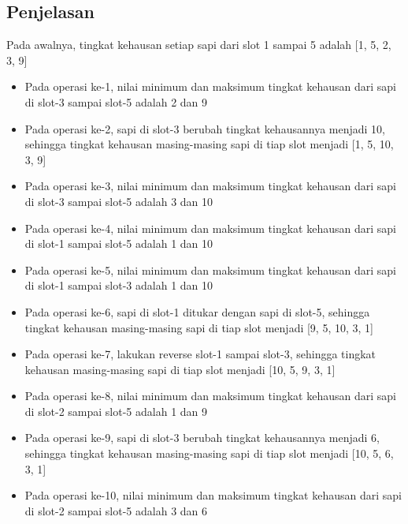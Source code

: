 \documentclass{article}
\begin{document}
\subsection*{Penjelasan}
Pada awalnya, tingkat kehausan setiap sapi dari slot 1 sampai 5 adalah [1, 5, 2, 3, 9]
\begin{itemize}
\item Pada operasi ke-1, nilai minimum dan maksimum tingkat kehausan dari sapi di slot-3 sampai slot-5 adalah 2 dan 9
\item Pada operasi ke-2, sapi di slot-3 berubah tingkat kehausannya menjadi 10, sehingga tingkat kehausan masing-masing sapi di tiap slot menjadi [1, 5, 10, 3, 9]
\item Pada operasi ke-3, nilai minimum dan maksimum tingkat kehausan dari sapi di slot-3 sampai slot-5 adalah 3 dan 10
\item Pada operasi ke-4, nilai minimum dan maksimum tingkat kehausan dari sapi di slot-1 sampai slot-5 adalah 1 dan 10
\item Pada operasi ke-5, nilai minimum dan maksimum tingkat kehausan dari sapi di slot-1 sampai slot-3 adalah 1 dan 10
\item Pada operasi ke-6, sapi di slot-1 ditukar dengan sapi di slot-5, sehingga tingkat kehausan masing-masing sapi di tiap slot menjadi [9, 5, 10, 3, 1]
\item Pada operasi ke-7, lakukan reverse slot-1 sampai slot-3, sehingga tingkat kehausan masing-masing sapi di tiap slot menjadi [10, 5, 9, 3, 1]
\item Pada operasi ke-8, nilai minimum dan maksimum tingkat kehausan dari sapi di slot-2 sampai slot-5 adalah 1 dan 9
\item Pada operasi ke-9, sapi di slot-3 berubah tingkat kehausannya menjadi 6, sehingga tingkat kehausan masing-masing sapi di tiap slot menjadi [10, 5, 6, 3, 1]
\item Pada operasi ke-10, nilai minimum dan maksimum tingkat kehausan dari sapi di slot-2 sampai slot-5 adalah 3 dan 6
\end{itemize}
\end{document}
